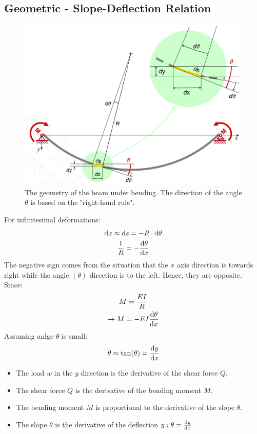 \documentclass[class=report, crop=false, 12pt,a4paper]{standalone}
\begin{document}
\subsection{Geometric - Slope-Deflection Relation}
\begin{figure}[H]
  \centering
  \includegraphics[width = 0.8 \textwidth]{../img/beam2.PNG}
  \caption{The geometry of the beam under bending. The direction of the angle $\theta$ is based on the "right-hand rule".}
\end{figure}
For infinitesimal deformations:
\begin{gather}
  \dif x \approx \dif s = -R\cdot \dif \theta \\
  \frac{1}{R} = -\frac{\dif \theta}{\dif x}
\end{gather}
The negative sign comes from the situation that the $x$ axis direction is towards right while the angle $(\theta)$ direction is to the left. Hence, they are opposite. Since:
\begin{gather}
  M = \frac{EI}{R} \\
  \rightarrow M = -EI\frac{\dif \theta}{\dif x}
\end{gather}
Assuming anlge $\theta$ is small:
\begin{gather}
  \theta \approx \tan(\theta) = \frac{\dif y}{\dif x}
\end{gather}
\begin{itemize} [noitemsep]
  \item The load $w$ in the $y$ direction is the derivative of the shear force $Q$.
  \item The shear force $Q$ is the derivative of the bending moment $M$. 
  \item The bending moment $M$ is proportional to the derivative of the slope $\theta$.
  \item The slope $\theta$ is the derivative of the deflection $y:\theta = \frac{\dif y}{\dif x}$
\end{itemize}
\end{document}
